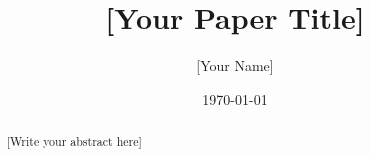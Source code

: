 \documentclass[12pt, a4paper]{article}
\title{[Your Paper Title]}
\author{[Your Name] \\ [Your Institution]}
\date{\today}
\begin{document}
\maketitle

\begin{abstract}
[Write your abstract here]
\end{abstract}

\tableofcontents
\newpage










\appendix
% 
\end{document}
